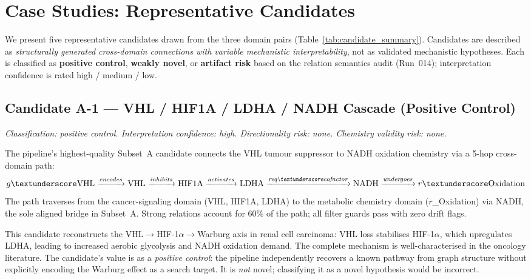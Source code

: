 \section{Case Studies: Representative Candidates}
\label{sec:casestudies}

We present five representative candidates drawn from the three domain pairs
(Table~\ref{tab:candidate_summary}).
Candidates are described as \textit{structurally generated cross-domain connections
with variable mechanistic interpretability}, not as validated mechanistic hypotheses.
Each is classified as \textbf{positive control}, \textbf{weakly novel}, or
\textbf{artifact risk} based on the relation semantics audit (Run~014);
interpretation confidence is rated high / medium / low.



\subsection{Candidate A-1 --- VHL / HIF1A / LDHA / NADH Cascade (Positive Control)}
\label{cs:a1}

\textit{Classification: positive control.
Interpretation confidence: high.
Directionality risk: none. Chemistry validity risk: none.}

\smallskip
The pipeline's highest-quality Subset~A candidate connects the VHL tumour suppressor
to NADH oxidation chemistry via a 5-hop cross-domain path:
\[
  g\textunderscore\mathrm{VHL} \xrightarrow{\textit{encodes}}
  \mathrm{VHL} \xrightarrow{\textit{inhibits}}
  \mathrm{HIF1A} \xrightarrow{\textit{activates}}
  \mathrm{LDHA} \xrightarrow{\textit{req\_cofactor}}
  \mathrm{NADH} \xrightarrow{\textit{undergoes}}
  r\textunderscore\mathrm{Oxidation}
\]
The path traverses from the cancer-signaling domain (VHL, HIF1A, LDHA) to the
metabolic chemistry domain ($r$\_Oxidation) via NADH, the sole aligned bridge
in Subset~A.
Strong relations account for 60\% of the path; all filter guards pass with zero
drift flags.

This candidate reconstructs the VHL$\to$HIF-1$\alpha$$\to$Warburg axis in renal
cell carcinoma: VHL loss stabilises HIF-1$\alpha$, which upregulates LDHA,
leading to increased aerobic glycolysis and NADH oxidation demand.
The complete mechanism is well-characterised in the oncology literature.
The candidate's value is as a \textit{positive control}: the pipeline independently
recovers a known pathway from graph structure without explicitly encoding the Warburg
effect as a search target.
It is \textit{not} novel; classifying it as a novel hypothesis would be incorrect.

